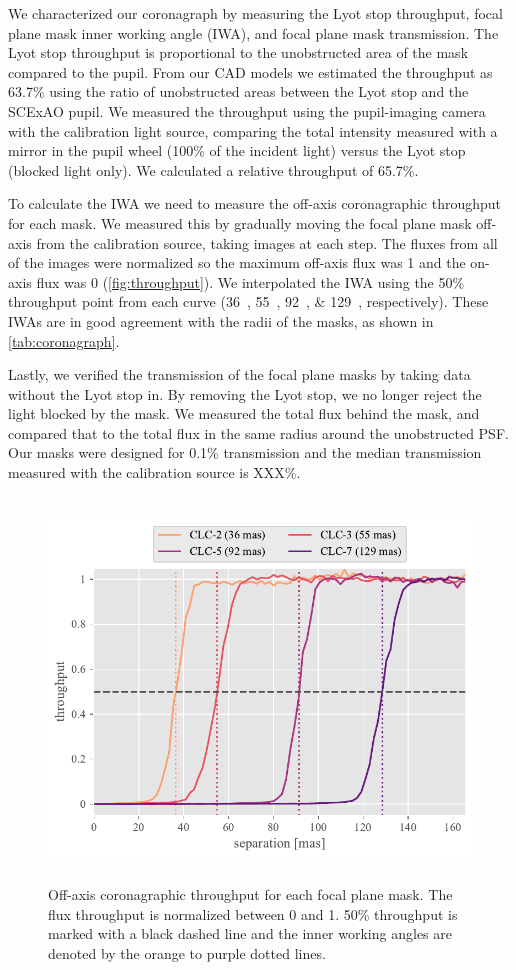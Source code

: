 \documentclass[]{spie}  %
\begin{document}
We characterized our coronagraph by measuring the Lyot stop throughput, focal plane mask inner working angle (IWA), and focal plane mask transmission. The Lyot stop throughput is proportional to the unobstructed area of the mask compared to the pupil. From our CAD models we estimated the throughput as 63.7\% using the ratio of unobstructed areas between the Lyot stop and the SCExAO pupil. We measured the throughput using the pupil-imaging camera with the calibration light source, comparing the total intensity measured with a mirror in the pupil wheel (100\% of the incident light) versus the Lyot stop (blocked light only). We calculated a relative throughput of 65.7\%.

To calculate the IWA we need to measure the off-axis coronagraphic throughput for each mask. We measured this by gradually moving the focal plane mask off-axis from the calibration source, taking images at each step. The fluxes from all of the images were normalized so the maximum off-axis flux was 1 and the on-axis flux was 0 (\autoref{fig:throughput}). We interpolated the IWA using the 50\% throughput point from each curve (\qtylist{36;55;92;129}{\milliarcsecond}, respectively). These IWAs are in good agreement with the radii of the masks, as shown in \autoref{tab:coronagraph}.

Lastly, we verified the transmission of the focal plane masks by taking data without the Lyot stop in. By removing the Lyot stop, we no longer reject the light blocked by the mask. We measured the total flux behind the mask, and compared that to the total flux in the same radius around the unobstructed PSF. Our masks were designed for 0.1\% transmission and the median transmission measured with the calibration source is XXX\%.


\begin{figure}
   \centering
   \includegraphics[height=4in]{figures/throughput_curves}
   \caption{Off-axis coronagraphic throughput for each focal plane mask. The flux throughput is normalized between 0 and 1. 50\% throughput is marked with a black dashed line and the inner working angles are denoted by the orange to purple dotted lines.}\label{fig:throughput}
\end{figure}
\end{document}
